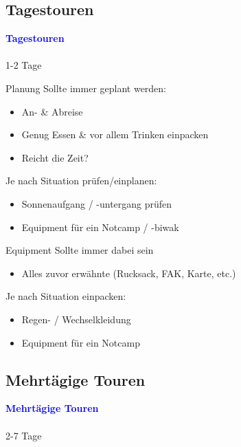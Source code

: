 \documentclass{beamer}
\begin{document}
		\subsection{Tagestouren}
		
			\begin{frame}
				\vspace{1cm}
				\begin{center}
					\textcolor{blue}{\textbf{Tagestouren}}
					\\\,\\
					{\scriptsize 1-2 Tage}
				\end{center}
			\end{frame}
			
			\begin{frame}{Planung}
				Sollte immer geplant werden:
				\begin{itemize}
					\item An- \& Abreise
					\item Genug Essen \& vor allem Trinken einpacken
					\item Reicht die Zeit?
				\end{itemize}
				Je nach Situation prüfen/einplanen:
				\begin{itemize}
					\item Sonnenaufgang / -untergang prüfen
					\item Equipment für ein Notcamp / -biwak
				\end{itemize}
			\end{frame}
			
			\begin{frame}{Equipment}
				Sollte immer dabei sein
				\begin{itemize}
					\item Alles zuvor erwähnte (Rucksack, FAK, Karte, etc.)
				\end{itemize}
				Je nach Situation einpacken:
				\begin{itemize}
					\item Regen- / Wechselkleidung
					\item Equipment für ein Notcamp
				\end{itemize}
			\end{frame}
			
		\subsection{Mehrtägige Touren}
		
			\begin{frame}
				\vspace{1cm}
				\begin{center}
					\textcolor{blue}{\textbf{Mehrtägige Touren}}
					\\\,\\
					{\scriptsize 2-7 Tage}
				\end{center}
			\end{frame}
		
\end{document}
